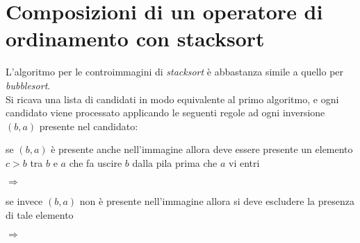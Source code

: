 \section*{Composizioni di un operatore di ordinamento con stacksort}
L'algoritmo per le controimmagini di \textit{stacksort} \`e abbastanza simile a quello per \textit{bubblesort}.\\
Si ricava una lista di candidati in modo equivalente al primo algoritmo, e ogni candidato viene processato applicando le seguenti regole ad ogni inversione $(b,a)$ presente nel candidato:
\begin{description}
\item se $(b,a)$ \`e presente anche nell'immagine allora deve essere presente un elemento $c>b$ tra $b$ e $a$ che fa uscire $b$ dalla pila prima che $a$ vi entri
\begin{center}
 $\Longrightarrow$ 
\end{center}
\item se invece $(b,a)$ non \`e presente nell'immagine allora si deve escludere la presenza di tale elemento
\begin{center}
 $\Longrightarrow$ 
\end{center}
\end{description}
